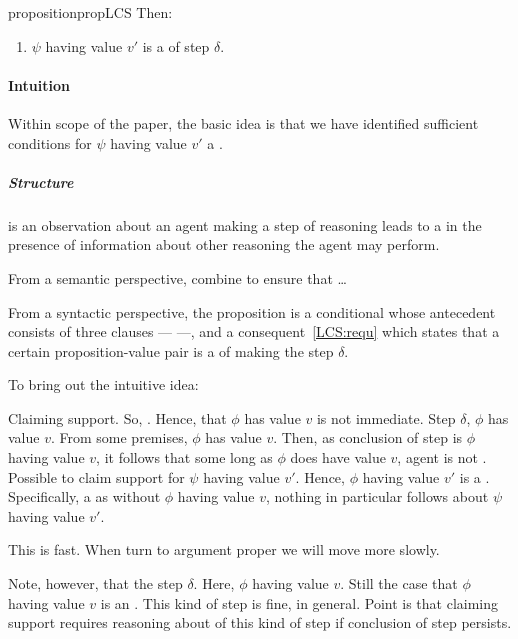 \begin{note}
\begin{restatable}{proposition}{propLCS}
    Then:
    \begin{enumerate}[ref=\named{\LCSAcro{}:\arabic*}, resume*=LCS_counter]
    \item
      \label{LCS:requ}
      \(\psi\) having value \(v'\) is a \cprequ{} of step \(\delta\).
    \end{enumerate}
    \vspace{-\baselineskip}
  \end{restatable}
\end{note}

\paragraph{Intuition}

\begin{note}
  Within scope of the paper, the basic idea is that we have identified sufficient conditions for \(\psi\) having value \(v'\) a \cprequ{}.
\end{note}

\subparagraph{Structure}

\begin{note}
  \LCS{} is an observation about an agent making a step of reasoning leads to a \cprequ{} in the presence of information about other reasoning the agent may perform.

  From a semantic perspective, \LCSBackground{} combine to ensure that \dots

  From a syntactic perspective, the proposition is a conditional whose antecedent consists of three clauses --- \LCSBackground{} ---, and a consequent~\ref{LCS:requ} which states that a certain proposition-value pair is a \cprequ{} of making the step \(\delta\).
\end{note}

\begin{note}
  To bring out the intuitive idea:

  Claiming support.
  So, \ep{}.
  Hence, that \(\phi\) has value \(v\) is not immediate.
  Step \(\delta\), \(\phi\) has value \(v\).
  From some premises, \(\phi\) has value \(v\).
  Then, as conclusion of step is \(\phi\) having value \(v\), it follows that some long as \(\phi\) does have value \(v\), agent is not \misled{}.
  Possible to claim support for \(\psi\) having value \(v'\).
  Hence, \(\phi\) having value \(v'\) is a \requ{}.
  Specifically, a \cprequ{} as without \(\phi\) having value \(v\), nothing in particular follows about \(\psi\) having value \(v'\).

  This is fast.
  When turn to argument proper we will move more slowly.

  Note, however, that the step \(\delta\).
  Here, \(\phi\) having value \(v\).
  Still the case that \(\phi\) having value \(v\) is an \ep{}.
  This kind of step is fine, in general.
  Point is that claiming support requires reasoning about  of this kind of step if conclusion of step persists.
  
\end{note}

